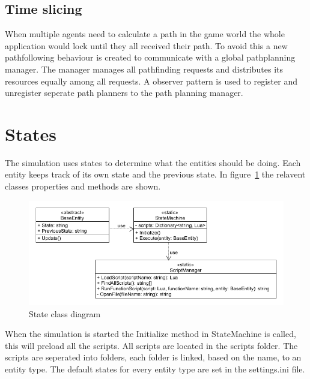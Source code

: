 \documentclass{article}
\begin{document}
   \subsection {Time slicing}
  When multiple agents need to calculate a path in the game world the whole application would lock until they all received their path. To avoid this a new pathfollowing behaviour is created to communicate with a global pathplanning manager. The manager manages all pathfinding requests and distributes its resources equally among all requests. A observer pattern is used to register and unregister seperate path planners to the path planning manager.
   
 
   \newpage   
   \section {States}
   The simulation uses states to determine what the entities should be doing. Each entity keeps track of its own state and the previous state. In figure~\ref{fig:stateClassDiagram} the relavent classes properties and methods are shown. 
   \begin{figure}[h!]
   \includegraphics[width=\textwidth]{stateuml.png}
   \caption{State class diagram}
   \label{fig:stateClassDiagram}
   \end{figure}
   When the simulation is started the Initialize method in StateMachine is called, this will preload all the scripts. All scripts are located in the scripts folder. The scripts are seperated into folders, each folder is linked, based on the name, to an entity type.
   The default states for every entity type are set in the settings.ini file.
\end{document}
